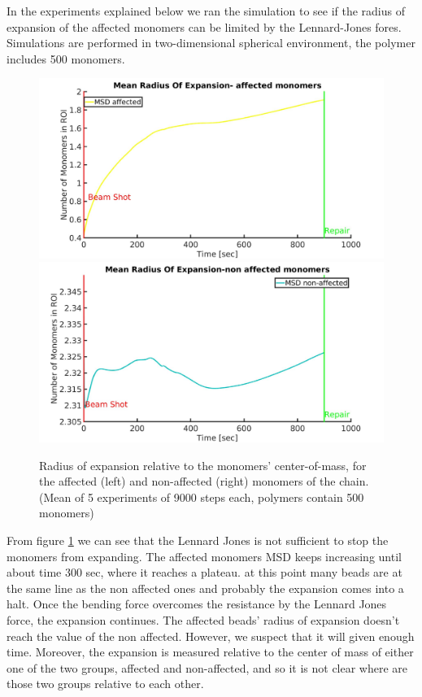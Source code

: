 \documentclass[12pt]{report}
\begin{document}
      In the experiments explained below we ran the simulation to see if the radius of expansion of the affected monomers can be limited by the Lennard-Jones fores. Simulations are performed in two-dimensional spherical environment, the polymer includes 500 monomers.
      
      
     \begin{figure}[H]
     \includegraphics[width=0.5\linewidth, height=0.3\textheight]{RadiusOfExpansion500BeadsLennardJones}
    	\includegraphics[width=0.5\linewidth, height=0.3\textheight]{RadiusOfExpansion500BeadsNonAffectedLennardJones}
        \caption{Radius of expansion relative to the monomers' center-of-mass, for the affected (left) and non-affected (right) monomers of the chain.(Mean of 5 experiments of 9000 steps each, polymers contain 500 monomers)}
        \label{fig:RadiusOfExpansion500BeadsLennardJones}
      \end{figure}
      
      From figure \ref{fig:RadiusOfExpansion500BeadsLennardJones} we can see that the Lennard Jones is not sufficient to stop the monomers from expanding. The affected monomers MSD keeps increasing until about time 300 sec, where it reaches a plateau. at this point many beads are at the same line as the non affected ones and probably the expansion comes into a halt. Once the bending force overcomes the resistance by the Lennard Jones force, the expansion continues. The affected beads' radius of expansion doesn't reach the value of the non affected. However, we suspect that it will given enough time. Moreover, the expansion is measured relative to the center of mass of either one of the two groups, affected and non-affected, and so it is not clear where are those two groups relative to each other. 
      
\end{document}
